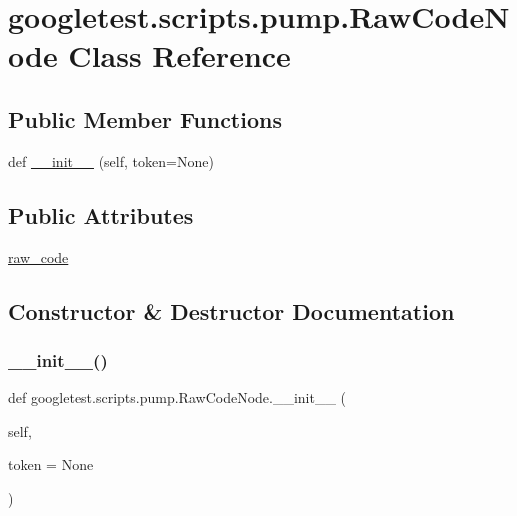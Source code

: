 \hypertarget{classgoogletest_1_1scripts_1_1pump_1_1_raw_code_node}{}\section{googletest.\+scripts.\+pump.\+Raw\+Code\+Node Class Reference}
\label{classgoogletest_1_1scripts_1_1pump_1_1_raw_code_node}
\subsection*{Public Member Functions}
\begin{DoxyCompactItemize}
\item 
def \mbox{\hyperlink{classgoogletest_1_1scripts_1_1pump_1_1_raw_code_node_a1f4eb318c7fa2ae579e41d7a1d51bbe9}{\+\_\+\+\_\+init\+\_\+\+\_\+}} (self, token=None)
\end{DoxyCompactItemize}
\subsection*{Public Attributes}
\begin{DoxyCompactItemize}
\item 
\mbox{\hyperlink{classgoogletest_1_1scripts_1_1pump_1_1_raw_code_node_a5859d5c13d0fa1b3efd41ef4faec8704}{raw\+\_\+code}}
\end{DoxyCompactItemize}


\subsection{Constructor \& Destructor Documentation}
\mbox{\label{classgoogletest_1_1scripts_1_1pump_1_1_raw_code_node_a1f4eb318c7fa2ae579e41d7a1d51bbe9}} 
\subsubsection{\texorpdfstring{\_\_init\_\_()}{\_\_init\_\_()}}
{\footnotesize\ttfamily def googletest.\+scripts.\+pump.\+Raw\+Code\+Node.\+\_\+\+\_\+init\+\_\+\+\_\+ (\begin{DoxyParamCaption}\item[{}]{self,  }\item[{}]{token = {\ttfamily None} }\end{DoxyParamCaption})}



